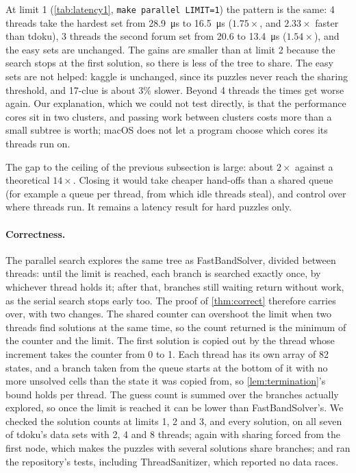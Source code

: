 \documentclass[11pt]{article}
\theoremstyle{definition}
\theoremstyle{plain}
\begin{document}
At limit 1 (\cref{tab:latency1}, \texttt{make parallel LIMIT=1}) the pattern is the same: 4 threads take the hardest set
from \SI{28.9}{\micro\second} to \SI{16.5}{\micro\second} ($1.75\times$, and $2.33\times$ faster than tdoku), 3 threads the second forum set from 20.6 to
\SI{13.4}{\micro\second} ($1.54\times$), and the easy sets are unchanged. The gains are smaller than at limit 2 because the search stops
at the first solution, so there is less of the tree to share.
The easy sets are not helped: kaggle is unchanged, since its puzzles never reach the sharing threshold, and 17-clue is
about 3\% slower. Beyond 4 threads the times get worse again. Our explanation, which we could not test directly, is that
the performance cores sit in two clusters, and passing work between clusters costs more than a small subtree is worth;
macOS does not let a program choose which cores its threads run on.

The gap to the ceiling of the previous subsection is large: about $2\times$ against a theoretical $14\times$. Closing it
would take cheaper hand-offs than a shared queue (for example a queue per thread, from which idle threads steal), and
control over where threads run. It remains a latency result for hard puzzles only.

\paragraph{Correctness.} The parallel search explores the same tree as FastBandSolver, divided between threads: until the limit is reached,
each branch is searched exactly once, by whichever thread holds it; after that, branches still waiting return without
work, as the serial search stops early too. The proof of \cref{thm:correct} therefore carries over, with two changes. The shared counter can overshoot the limit when two threads find solutions at the same time, so the
count returned is the minimum of the counter and the limit. The first solution is copied out by the thread whose increment takes the counter from 0 to 1. Each thread has its own
array of 82 states, and a branch taken from the queue starts at the bottom of it with no more unsolved cells than the
state it was copied from, so \cref{lem:termination}'s bound holds per thread. The guess count is summed over the
branches actually explored, so once the limit is reached it can be lower than FastBandSolver's. We checked the solution counts at limits 1, 2 and 3, and every solution, on
all seven of tdoku's data sets with 2, 4 and 8 threads; again with sharing forced from the first node, which makes the
puzzles with several solutions share branches; and ran the repository's tests, including ThreadSanitizer, which reported
no data races.
\end{document}

